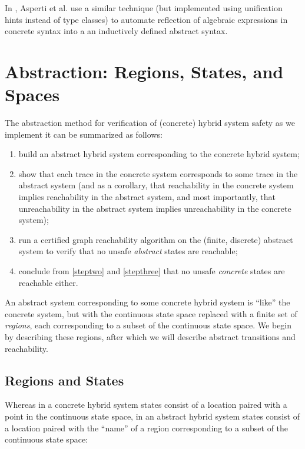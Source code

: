 \documentclass[runningheads]{llncs}
\begin{document}
In \cite{hintsinunification}, Asperti et al. use a similar technique (but implemented using unification hints instead of type classes) to automate reflection of algebraic expressions in concrete syntax into a an inductively defined abstract syntax.

\section{Abstraction: Regions, States, and Spaces}
\label{abstraction}

The abstraction method for verification of (concrete) hybrid system safety as we implement it can be summarized as follows:
\begin{enumerate}
\item build an abstract hybrid system corresponding to the concrete hybrid system;
\item \label{steptwo} show that each trace in the concrete system corresponds to some trace in the abstract system (and as a corollary, that reachability in the concrete system implies reachability in the abstract system, and most importantly, that unreachability in the abstract system implies unreachability in the concrete system);
\item \label{stepthree} run a certified graph reachability algorithm on the (finite, discrete) abstract system to verify that no unsafe \emph{abstract} states are reachable;
\item conclude from \ref{steptwo} and \ref{stepthree} that no unsafe \emph{concrete} states are reachable either.
\end{enumerate}

An abstract system corresponding to some concrete hybrid system is ``like'' the concrete system, but with the continuous state space replaced with a finite set of \emph{regions}, each corresponding to a subset of the continuous state space. We begin by describing these regions, after which we will describe abstract transitions and reachability.

\subsection{Regions and States}
\label{regionsandstates}

Whereas in a concrete hybrid system states consist of a location paired with a point in the continuous state space, in an abstract hybrid system states consist of a location paired with the ``name'' of a region corresponding to a subset of the continuous state space:
\end{document}
